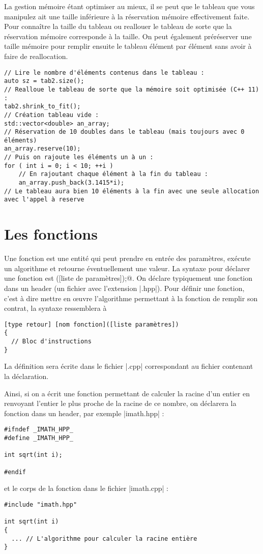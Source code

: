 La gestion mémoire étant optimiser au mieux, il se peut que le tableau que vous manipulez ait une taille inférieure à la réservation mémoire effectivement faite. Pour connaître la taille du tableau ou reallouer le tableau de sorte que la réservation mémoire corresponde à la taille.
On peut également préréserver une taille mémoire pour remplir ensuite le tableau élément par élément sans avoir à faire de reallocation.

\begin{lstlisting}
// Lire le nombre d'éléments contenus dans le tableau :
auto sz = tab2.size();
// Realloue le tableau de sorte que la mémoire soit optimisée (C++ 11) :
tab2.shrink_to_fit(); 
// Création tableau vide :
std::vector<double> an_array;
// Réservation de 10 doubles dans le tableau (mais toujours avec 0 éléments)
an_array.reserve(10);
// Puis on rajoute les éléments un à un :
for ( int i = 0; i < 10; ++i )
    // En rajoutant chaque élément à la fin du tableau :
    an_array.push_back(3.1415*i);
// Le tableau aura bien 10 éléments à la fin avec une seule allocation avec l'appel à reserve
\end{lstlisting}

\section{Les fonctions}

Une fonction est une entité qui peut prendre en entrée des paramètres, 
exécute un algorithme et retourne éventuellement une valeur. La syntaxe
pour déclarer une fonction est ([liste de paramètres]);@.
On déclare typiquement une fonction dans un header (un fichier avec l'extension |.hpp|).
Pour définir une fonction, c'est à dire mettre en {\oe}uvre l'algorithme permettant à la fonction
de remplir son contrat, la syntaxe ressemblera à
\begin{verbatim}
[type retour] [nom fonction]([liste paramètres])
{
  // Bloc d'instructions
}
\end{verbatim}

La définition sera écrite dans le fichier |.cpp| correspondant au fichier contenant la déclaration.

Ainsi, si on a écrit une fonction permettant de calculer la racine d'un entier en renvoyant l'entier le plus proche de la racine de ce nombre, on déclarera la fonction dans un header, par exemple
|imath.hpp| :
\begin{lstlisting}[caption=Fichier imath.hpp]
#ifndef _IMATH_HPP_
#define _IMATH_HPP_

int sqrt(int i);

#endif
\end{lstlisting}
et le corps de la fonction dans le fichier |imath.cpp| :
\begin{lstlisting}[caption=Fichier imath.cpp]
#include "imath.hpp"

int sqrt(int i)
{
  ... // L'algorithme pour calculer la racine entière
}
\end{lstlisting}

